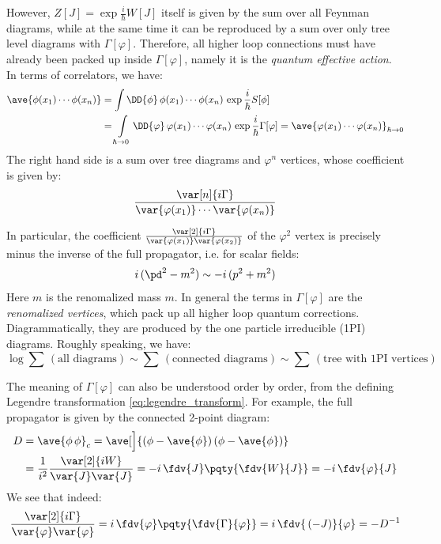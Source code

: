 \documentclass[a4paper
	,10pt
]{article}
\begin{document}
	However, $Z[J] = \exp \frac{i}{\hbar} W[J]$ itself is given by the sum over all Feynman diagrams, while at the same time it can be reproduced by a sum over only tree level diagrams with $\Gamma[\varphi]$. Therefore, all higher loop connections must have already been packed up inside $\Gamma[\varphi]$, namely it is the \textit{quantum effective action}. In terms of correlators, we have:
	\begin{equation}
	\begin{aligned}
		\ave{\phi(x_1)\cdots\phi(x_n)}
		&= \int
			\DD{\phi}
			\,\phi(x_1)\cdots\phi(x_n)\,
			\exp \frac{i}{\hbar}
				S[\phi]
	\\
		&= \int\limits_{\hbar\to 0}
			\DD{\varphi}
			\,\varphi(x_1)\cdots\varphi(x_n)\,
			\exp \frac{i}{\hbar}
				\Gamma[\varphi]
		= \ave{\varphi(x_1)\cdots\varphi(x_n)}_{\hbar\to 0}
	\end{aligned}
	\end{equation}
	The right hand side is a sum over tree diagrams and $\varphi^n$ vertices, whose coefficient is given by:
	\begin{equation}
		\frac{\var[n]{i\Gamma}}{
			\var{\varphi(x_1)}\cdots\var{\varphi(x_n)}
		}
	\end{equation}
	
	In particular, the coefficient $
		\frac{\var[2]{i\Gamma}}{
			\var{\varphi(x_1)} \var{\varphi(x_2)}
		}
	$ of the $\varphi^2$ vertex is precisely minus the inverse of the full propagator, i.e. for scalar fields:
	\begin{equation}
		i\,(\pd^2-m^2) \sim -i\,(p^2 + m^2)
	\end{equation}
	Here $m$ is the renomalized mass $m$. In general the terms in $\Gamma[\varphi]$ are the \textit{renomalized vertices}, which pack up all higher loop quantum corrections. Diagrammatically, they are produced by the one particle irreducible (1PI) diagrams. Roughly speaking, we have:
	\begin{equation}
		\log \sum \,(\text{all diagrams})
		\sim \sum \,(\text{connected diagrams})
		\sim \sum \,(\text{tree with 1PI vertices})
	\end{equation}
	
	The meaning of $\Gamma[\varphi]$ can also be understood order by order, from the defining Legendre transformation \eqref{eq:legendre_transform}. For example, the full propagator is given by the connected 2-point diagram:
	\begin{equation}
	\begin{aligned}
		D
		&= \ave{\phi\,\phi}_c
		= \ave[\Big]{
			(\phi - \ave{\phi})\,(\phi - \ave{\phi})
		} \\
		&= \frac{1}{i^2}
		\frac{\var[2]{iW}}{
			\var{J} \var{J}
		}
		= -i\,\fdv{J} \pqty{\fdv{W}{J}}
		= -i\,\fdv{\varphi}{J}
	\end{aligned}
	\end{equation}
	We see that indeed:
	\begin{equation}
		\frac{\var[2]{i\Gamma}}{
			\var{\varphi} \var{\varphi}
		}
		= i\,\fdv{\varphi} \pqty{\fdv{\Gamma}{\varphi}}
		= i\,\fdv{\,(-J)}{\varphi}
		= - D^{-1}
	\end{equation}
	
\end{document}
